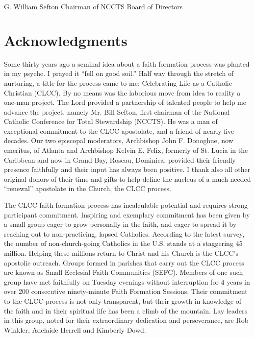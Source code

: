 \documentclass[oneside]{book}
\begin{document}
G. William Sefton
Chairman of NCCTS Board of Directors


\chapter{Acknowledgments}

Some thirty years ago a seminal idea about a faith formation process was planted
in my psyche. I prayed it ``fell on good soil.'' Half way through the stretch of
nurturing, a title for the process came to me: Celebrating Life as a Catholic
Christian (CLCC). By no means was the laborious move from idea to reality a
one-man project. The Lord provided a partnership of talented people to help me
advance the project, namely Mr. Bill Sefton, first chairman of the National
Catholic Conference for Total Stewardship (NCCTS). He was a man of exceptional
commitment to the CLCC apostolate, and a friend of nearly five decades. Our two
episcopal moderators, Archbishop John F. Donoghue, now emeritus, of Atlanta and
Archbishop Kelvin E. Felix, formerly of St. Lucia in the Caribbean and now in
Grand Bay, Roseau, Dominica, provided their friendly presence faithfully and
their input has always been positive. I thank also all other original donors of
their time and gifts to help define the nucleus of a much-needed ``renewal''
apostolate in the Church, the CLCC process.

The CLCC faith formation process has incalculable potential and requires strong
participant commitment. Inspiring and exemplary commitment has been given by a
small group eager to grow personally in the faith, and eager to spread it by
reaching out to non-practicing, lapsed Catholics. According to the latest
survey, the number of non-church-going Catholics in the U.S. stands at a
staggering 45 million. Helping these millions return to Christ and his Church is
the CLCC's apostolic outreach. Groups formed in parishes that carry out the CLCC
process are known as Small Ecclesial Faith Communities (SEFC). Members of one
such group have met faithfully on Tuesday evenings without interruption for 4
years in over 200 consecutive ninety-minute Faith Formation Sessions. Their
commitment to the CLCC process is not only transparent, but their growth in
knowledge of the faith and in their spiritual life has been a climb of the
mountain. Lay leaders in this group, noted for their extraordinary dedication
and perseverance, are Rob Winkler, Adelaide Herrell and Kimberly Dowd.
\end{document}
